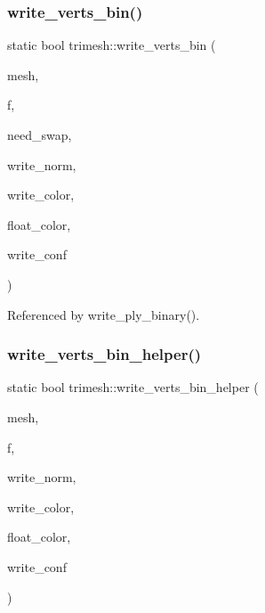 \mbox{\label{namespacetrimesh_a91ab9bd3b846abce4b51ba90a33fef53}} 
\subsubsection{\texorpdfstring{write\+\_\+verts\+\_\+bin()}{write\_verts\_bin()}}
{\footnotesize\ttfamily static bool trimesh\+::write\+\_\+verts\+\_\+bin (\begin{DoxyParamCaption}\item[{\hyperlink{classtrimesh_1_1TriMesh}{Tri\+Mesh} $\ast$}]{mesh,  }\item[{F\+I\+LE $\ast$}]{f,  }\item[{bool}]{need\+\_\+swap,  }\item[{bool}]{write\+\_\+norm,  }\item[{bool}]{write\+\_\+color,  }\item[{bool}]{float\+\_\+color,  }\item[{bool}]{write\+\_\+conf }\end{DoxyParamCaption})\hspace{0.3cm}{\ttfamily [static]}}



Referenced by write\+\_\+ply\+\_\+binary().

\mbox{\label{namespacetrimesh_aac722bf617598a0ca0b218bba6b07bb7}} 
\subsubsection{\texorpdfstring{write\+\_\+verts\+\_\+bin\+\_\+helper()}{write\_verts\_bin\_helper()}}
{\footnotesize\ttfamily static bool trimesh\+::write\+\_\+verts\+\_\+bin\+\_\+helper (\begin{DoxyParamCaption}\item[{\hyperlink{classtrimesh_1_1TriMesh}{Tri\+Mesh} $\ast$}]{mesh,  }\item[{F\+I\+LE $\ast$}]{f,  }\item[{bool}]{write\+\_\+norm,  }\item[{bool}]{write\+\_\+color,  }\item[{bool}]{float\+\_\+color,  }\item[{bool}]{write\+\_\+conf }\end{DoxyParamCaption})\hspace{0.3cm}{\ttfamily [static]}}



